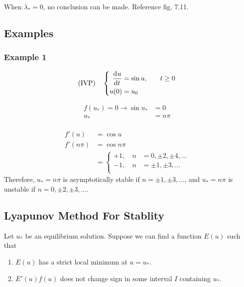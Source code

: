 \documentclass[12pt]{article}
\begin{document}
When $\lambda_*=0$, no conclusion can be made. Reference fig. 7.11.

\subsection{Examples}
\subsubsection*{Example 1}
\begin{equation} \text{(IVP)} \quad
  \left\{
  \begin{aligned}
    \frac{\mathrm{d}^{} {u}}{\mathrm{d}{t}^{}} &= \sin u, &\quad t&\ge 0 \\
    u(0) &= u_0 \\
  \end{aligned} \right.
\end{equation}

\begin{equation}
  \begin{aligned}
    f(u_*) = 0 \rightarrow \sin u_* & = 0 \\
    u_*  &= n\pi \\
  \end{aligned}
\end{equation}

\begin{equation}
  \begin{aligned}
    f'(u) &= \cos u \\
    f'(n\pi) &= \cos n\pi \\
    &= \left\{
    \begin{aligned}
      +1,\quad n&=0,\pm2,\pm4,\ldots \\
      -1,\quad n&=\pm1,\pm3,\ldots \\
    \end{aligned}
    \right.
  \end{aligned}
\end{equation}
Therefore, $u_*=n\pi$ is asymptotically stable if $n=\pm1,\pm3,\ldots$, and
$u_*=n\pi$ is unstable if $n=0,\pm2,\pm3,\ldots$.

\subsection{Lyapunov Method For Stablity}
Let $u_*$ be an equilibrium solution. Suppose we can find a function $E(u)$ such
that
\begin{enumerate}
\item $E(u)$ has a strict local minimum at $u=u_*$.
\item $E'(u)f(u)$ does not change sign in some interval $I$ containing $u_*$.
\end{enumerate}
\end{document}
